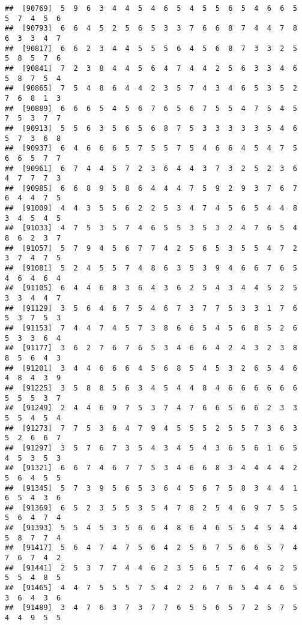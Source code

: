 \documentclass[
]{book}
\begin{document}
\begin{verbatim}
##  [90769]  5  9  6  3  4  4  5  4  6  5  4  5  5  6  5  4  6  6  5  5  7  4  5  6
##  [90793]  6  6  4  5  2  5  6  5  3  3  7  6  6  8  7  4  4  7  8  6  3  3  4  7
##  [90817]  6  6  2  3  4  4  5  5  5  6  4  5  6  8  7  3  3  2  5  5  8  5  7  6
##  [90841]  7  2  3  8  4  4  5  6  4  7  4  4  2  5  6  3  3  4  6  5  8  7  5  4
##  [90865]  7  5  4  8  6  4  4  2  3  5  7  4  3  4  6  5  3  5  2  7  6  8  1  3
##  [90889]  6  6  6  5  4  5  6  7  6  5  6  7  5  5  4  7  5  4  5  7  5  3  7  7
##  [90913]  5  5  6  3  5  6  5  6  8  7  5  3  3  3  3  3  5  4  6  5  7  3  6  8
##  [90937]  6  4  6  6  6  5  7  5  5  7  5  4  6  6  4  5  4  7  5  6  6  5  7  7
##  [90961]  6  7  4  4  5  7  2  3  6  4  4  3  7  3  2  5  2  3  6  4  7  7  7  3
##  [90985]  6  6  8  9  5  8  6  4  4  4  7  5  9  2  9  3  7  6  7  6  4  4  7  5
##  [91009]  4  4  3  5  5  6  2  2  5  3  4  7  4  5  6  5  4  4  8  3  4  5  4  5
##  [91033]  4  7  5  3  5  7  4  6  5  5  3  5  3  2  4  7  6  5  4  8  6  2  3  7
##  [91057]  5  7  9  4  5  6  7  7  4  2  5  6  5  3  5  5  4  7  2  3  7  4  7  5
##  [91081]  5  2  4  5  5  7  4  8  6  3  5  3  9  4  6  6  7  6  5  4  6  4  6  4
##  [91105]  6  4  4  6  8  3  6  4  3  6  2  5  4  3  4  4  5  2  5  3  3  4  4  7
##  [91129]  3  5  6  4  6  7  5  4  6  7  3  7  7  5  3  3  1  7  6  5  3  7  5  3
##  [91153]  7  4  4  7  4  5  7  3  8  6  6  5  4  5  6  8  5  2  6  5  3  3  6  4
##  [91177]  3  6  2  7  6  7  6  5  3  4  6  6  4  2  4  3  2  3  8  8  5  6  4  3
##  [91201]  3  4  4  6  6  6  4  5  6  8  5  4  5  3  2  6  5  4  6  4  8  4  3  9
##  [91225]  3  5  8  8  5  6  3  4  5  4  4  8  4  6  6  6  6  6  6  5  5  5  3  7
##  [91249]  2  4  4  6  9  7  5  3  7  4  7  6  6  5  6  6  2  3  3  5  5  4  5  4
##  [91273]  7  7  5  3  6  4  7  9  4  5  5  5  2  5  5  7  3  6  3  5  2  6  6  7
##  [91297]  3  5  7  6  7  3  5  4  3  4  5  4  3  6  5  6  1  6  5  4  5  3  5  3
##  [91321]  6  6  7  4  6  7  7  5  3  4  6  6  8  3  4  4  4  4  2  5  6  4  5  5
##  [91345]  5  7  3  9  5  6  5  3  6  4  5  6  7  5  8  3  4  4  1  6  5  4  3  6
##  [91369]  6  5  2  3  5  5  3  5  4  7  8  2  5  4  6  9  7  5  5  5  6  4  7  4
##  [91393]  5  5  4  5  3  5  6  6  4  8  6  4  6  5  5  4  5  4  4  5  8  7  7  4
##  [91417]  5  6  4  7  4  7  5  6  4  2  5  6  7  5  6  6  5  7  4  7  6  7  4  2
##  [91441]  2  5  3  7  7  4  4  6  2  3  5  6  5  7  6  4  6  2  5  5  5  4  8  5
##  [91465]  4  4  7  5  5  5  7  5  4  2  2  6  7  6  5  4  4  6  5  3  6  4  3  6
##  [91489]  3  4  7  6  3  7  3  7  7  6  5  5  6  5  7  2  5  7  5  4  4  9  5  5

\end{verbatim}
\end{document}
